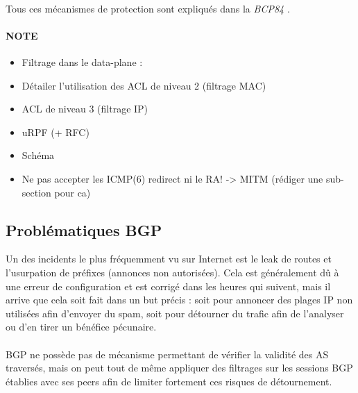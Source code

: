 \paragraph{}
Tous ces mécanismes de protection sont expliqués dans la \emph{BCP84} \cite{fenioux:BCP84}.


\paragraph{NOTE}
\begin{itemize}
\item Filtrage dans le data-plane : 
\item Détailer l'utilisation des ACL de niveau 2 (filtrage MAC)
\item ACL de niveau 3 (filtrage IP) 
\item uRPF (+ RFC)
\item Schéma
\item Ne pas accepter les ICMP(6) redirect ni le RA! -> MITM (rédiger une sub-section pour ca)
\end{itemize}


\subsection{Problématiques BGP}

Un des incidents le plus fréquemment vu sur Internet est le leak de routes et l'usurpation de préfixes (annonces non autorisées). Cela est généralement dû à une erreur de configuration et est corrigé dans les heures qui suivent, mais il arrive que cela soit fait dans un but précis : soit pour annoncer des plages IP non utilisées afin d'envoyer du spam, soit pour détourner du trafic afin de l'analyser ou d'en tirer un bénéfice pécunaire.

\paragraph{}
BGP ne possède pas de mécanisme permettant de vérifier la validité des AS traversés, mais on peut tout de même appliquer des filtrages sur les sessions BGP établies avec ses peers afin de limiter fortement ces risques de détournement.

